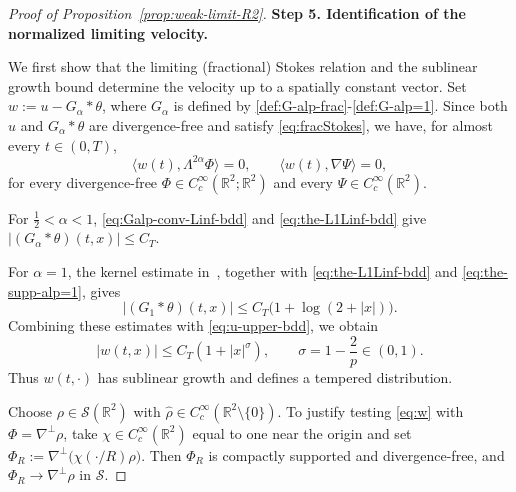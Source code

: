 \documentclass[reqno,11pt,a4paper]{amsart}
\newcommand{\dd}{\mathrm{d}}
\renewcommand{\div}{{\rm div\,}}
\begin{document}
\begin{proof}[Proof of Proposition~\ref{prop:weak-limit-R2}]

\medskip
\noindent\textbf{Step 5. Identification of the normalized limiting velocity.}


We first show that the limiting (fractional) Stokes relation
and the sublinear growth bound determine the velocity
up to a spatially constant vector.
Set $w:=u-G_\alpha*\theta$, 
where $G_\alpha$ is defined by
\eqref{def:G-alp-frac}-\eqref{def:G-alp=1}.
Since both $u$ and $G_\alpha*\theta$ are divergence-free
and satisfy \eqref{eq:fracStokes}, we have,
for almost every $t\in(0,T)$,
\begin{equation}\label{eq:w}
  \langle w(t),\Lambda^{2\alpha}\Phi\rangle=0,
  \qquad
  \langle w(t),\nabla\Psi\rangle=0,
\end{equation}
for every divergence-free
$\Phi\in C_c^\infty(\mathbb R^2;\mathbb R^2)$
and every $\Psi\in C_c^\infty(\mathbb R^2)$.

For $\frac12<\alpha<1$,
\eqref{eq:Galp-conv-Linf-bdd}
and \eqref{eq:the-L1Linf-bdd} give $|(G_\alpha*\theta)(t,x)|\leq C_T$.

For $\alpha=1$, the kernel estimate
in~\cite[Lemma~1]{Gray23}, together with
\eqref{eq:the-L1Linf-bdd}
and \eqref{eq:the-supp-alp=1}, gives
\[
  |(G_1*\theta)(t,x)|
  \leq C_T\bigl(1+\log(2+|x|)\bigr).
\]
Combining these estimates with \eqref{eq:u-upper-bdd},
we obtain
\[
  |w(t,x)|\leq C_T(1+|x|^\sigma),
  \qquad \sigma=1-\frac2p\in(0,1).
\]
Thus $w(t,\cdot)$ has sublinear growth
and defines a tempered distribution.

Choose $\rho\in\mathcal S(\mathbb R^2)$ with
$\widehat\rho\in C_c^\infty(\mathbb R^2\setminus\{0\})$.
To justify testing \eqref{eq:w} with
$\Phi=\nabla^\perp\rho$, take
$\chi\in C_c^\infty(\mathbb R^2)$ equal to one
near the origin and set $\Phi_R:=\nabla^\perp\bigl(\chi(\cdot/R)\rho\bigr)$. 
Then $\Phi_R$ is compactly supported and divergence-free,
and $\Phi_R\to\nabla^\perp\rho$ in $\mathcal S$.


\end{proof}
\end{document}
